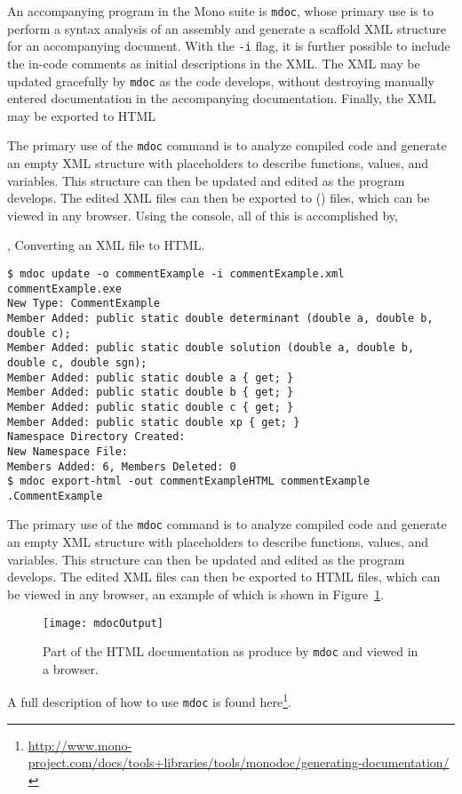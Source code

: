An accompanying program in the Mono suite is \lstinline[language=console]!mdoc!, whose primary use is to perform a syntax analysis of an assembly and generate a scaffold XML structure for an accompanying document. With the \lstinline[language=console]!-i! flag, it is further possible to include the in-code comments as initial descriptions in the XML. The XML may be updated gracefully by \lstinline[language=console]!mdoc! as the code develops, without destroying manually entered documentation in the accompanying documentation. Finally, the XML may be exported to HTML

The primary use of the \lstinline[language=console]{mdoc} command is to analyze compiled code and generate an empty XML structure with placeholders to describe functions, values, and variables. This structure can then be updated and edited as the program develops. The edited XML files can then be exported to  () files, which can be viewed in any browser. Using the console, all of this is accomplished by,
\begin{codeNOutput}{, Converting an XML file to HTML.}
\begin{lstlisting}[language=console]
$ mdoc update -o commentExample -i commentExample.xml commentExample.exe 
New Type: CommentExample
Member Added: public static double determinant (double a, double b, double c);
Member Added: public static double solution (double a, double b, double c, double sgn);
Member Added: public static double a { get; }
Member Added: public static double b { get; }
Member Added: public static double c { get; }
Member Added: public static double xp { get; }
Namespace Directory Created: 
New Namespace File: 
Members Added: 6, Members Deleted: 0
$ mdoc export-html -out commentExampleHTML commentExample
.CommentExample
\end{lstlisting}
\end{codeNOutput}
The primary use of the \lstinline[language=console]{mdoc} command is to analyze compiled code and generate an empty XML structure with placeholders to describe functions, values, and variables. This structure can then be updated and edited as the program develops. The edited XML files can then be exported to HTML files, which can be viewed in any browser, an example of which is shown in Figure~\ref{fig:htmlDocumentExample}.
\begin{figure}
  \centering
  \texttt{[image: mdocOutput]}
  \caption{Part of the HTML documentation as produce by \lstinline[language=console]{mdoc} and viewed in a browser.}
  \label{fig:htmlDocumentExample}
\end{figure}
A full description of how to use \lstinline[language=console]{mdoc} is found here\footnote{\url{http://www.mono-project.com/docs/tools+libraries/tools/monodoc/generating-documentation/}}.

